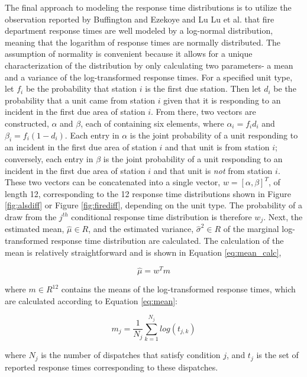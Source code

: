 \documentclass[article]{proc}
\begin{document}
The final approach to modeling the response time distributions is to utilize the observation reported by Buffington and Ezekoye \cite{buffington2019statistical} and Lu Lu et al. \cite{lu2014correlation} that fire department response times are well modeled by a log-normal distribution, meaning that the logarithm of response times are normally distributed. The assumption of normality is convenient because it allows for a unique characterization of the distribution by only calculating two parameters- a mean and a variance of the log-transformed response times. For a specified unit type, let $f_i$ be the probability that station $i$ is the first due station.  Then let $d_i$ be the probability that a unit came from station $i$ given that it is responding to an incident in the first due area of station $i$. From there, two vectors are constructed, $\alpha$ and $\beta$, each of containing six elements, where $\alpha_i = f_id_i$ and $\beta_i = f_i(1-d_i)$. Each entry in $\alpha$ is the joint probability of a unit responding to an incident in the first due area of station $i$ and that unit is from station $i$; conversely, each entry in $\beta$ is the joint probability of a unit responding to an incident in the first due area of station $i$ and that unit is \textit{not} from station $i$. These two vectors can be concatenated into a single vector, $w = [\alpha, \beta]^T$, of length 12, corresponding to the 12 response time distributions shown in Figure \ref{fig:alsdiff} or Figure \ref{fig:firediff}, depending on the unit type. The probability of a draw from the $j^{th}$ conditional response time distribution is therefore $w_j$. Next, the estimated mean, $\hat\mu \in R$, and the estimated variance, $\hat\sigma^2 \in R$ of the marginal log-transformed response time distribution are calculated. The calculation of the mean is relatively straightforward and is shown in Equation \ref{eq:mean_calc},


\begin{equation}
\hat\mu = w^Tm
\label{eq:mean_calc}
\end{equation}


where $m \in R^{12}$ contains the means of the log-transformed response times, which are calculated according to Equation \ref{eq:mean}:

\begin{equation}
m_j = \frac{1}{N_j}\sum_{k=1}^{N_j}log(t_{j,k})
\label{eq:mean}
\end{equation}


where $N_j$ is the number of dispatches that satisfy condition $j$, and $t_j$ is the set of reported response times corresponding to these dispatches.
\end{document}
